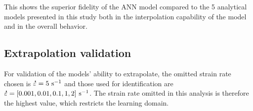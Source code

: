 \documentclass[twoside,english,1p,final,sort&compress]{elsarticle}
\theoremstyle{plain}
\DeclareRobustCommand{\mdot}[1]{\accentset{\mbox{\bfseries .}}{#1}}
\DeclareRobustCommand{\ps}{\text{s}^{-1}}
\begin{document}
This shows the superior fidelity of the ANN model compared to the 5 analytical models presented in this study both in the interpolation capability of the model and in the overall behavior.

\subsection{Extrapolation validation}

For validation of the models' ability to extrapolate, the omitted strain rate chosen is $\mdot\varepsilon=5~\ps$ and those used for identification are $\mdot\varepsilon=[0.001, 0.01, 0.1, 1, 2]~\ps$.
The strain rate omitted in this analysis is therefore the highest value, which restricts the learning domain.
\end{document}
